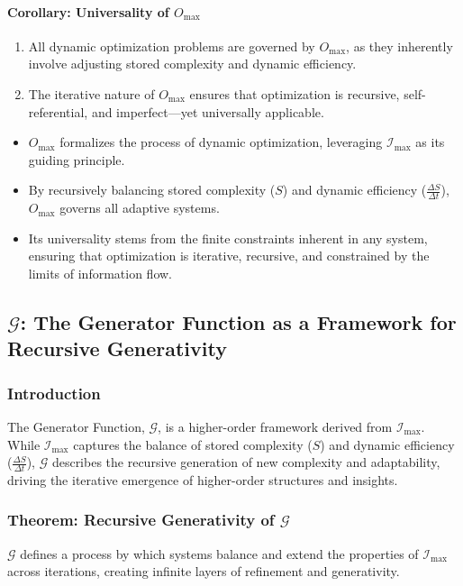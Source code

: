 \documentclass[12pt]{article}
\begin{document}
\paragraph{Corollary: Universality of \(O_{\text{max}}\)}
\begin{enumerate}
    \item All dynamic optimization problems are governed by \(O_{\text{max}}\), as they inherently involve adjusting stored complexity and dynamic efficiency.
    \item The iterative nature of \(O_{\text{max}}\) ensures that optimization is recursive, self-referential, and imperfect—yet universally applicable.
\end{enumerate}


\begin{itemize}
    \item \(O_{\text{max}}\) formalizes the process of dynamic optimization, leveraging \(\mathcal{I}_{\text{max}}\) as its guiding principle.
    \item By recursively balancing stored complexity (\(S\)) and dynamic efficiency (\(\frac{\Delta S}{\Delta t}\)), \(O_{\text{max}}\) governs all adaptive systems.
    \item Its universality stems from the finite constraints inherent in any system, ensuring that optimization is iterative, recursive, and constrained by the limits of information flow.
\end{itemize}


\subsection{\(\mathcal{G}\): The Generator Function as a Framework for Recursive Generativity}

\subsubsection{Introduction}
The Generator Function, \(\mathcal{G}\), is a higher-order framework derived from \(\mathcal{I}_{\text{max}}\). While \(\mathcal{I}_{\text{max}}\) captures the balance of stored complexity (\(S\)) and dynamic efficiency (\(\frac{\Delta S}{\Delta t}\)), \(\mathcal{G}\) describes the recursive generation of new complexity and adaptability, driving the iterative emergence of higher-order structures and insights.

\subsubsection{Theorem: Recursive Generativity of \(\mathcal{G}\)}
\(\mathcal{G}\) defines a process by which systems balance and extend the properties of \(\mathcal{I}_{\text{max}}\) across iterations, creating infinite layers of refinement and generativity.
\end{document}
